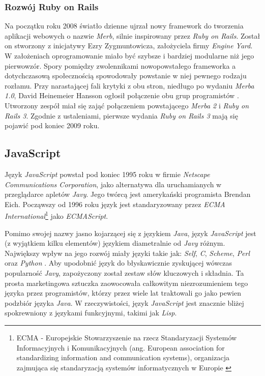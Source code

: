 \documentclass[a4paper,12pt]{article}
\begin{document}
\subsubsection{Rozwój Ruby on Rails}
Na początku roku 2008 światło dzienne ujrzał nowy framework do
tworzenia aplikacji webowych o nazwie \emph{Merb}, silnie inspirowany
przez \emph{Ruby on Rails}. Został on stworzony z inicjatywy Ezry
Zygmuntowicza, założyciela firmy \emph{Engine Yard}. W założeniach
oprogramowanie miało być szybsze i bardziej modularne niż jego
pierwowzór. Spory pomiędzy zwolennikami nowopowstałego frameworka a
dotychczasową społecznością spowodowały powstanie w niej pewnego
rodzaju rozłamu. Przy narastającej fali krytyki z obu stron, niedługo
po wydaniu \emph{Merba 1.0}, David Heinemeier Hansson ogłosił
połączenie obu grup programistów \cite{merge}. Utworzony zespół miał
się zająć połączeniem powstającego \emph{Merba 2} i \emph{Ruby on
  Rails 3}. Zgodnie z ustaleniami, pierwsze wydania \emph{Ruby on
  Rails 3} mają się pojawić pod koniec 2009 roku.

\subsection{JavaScript}
Język \emph{JavaScript} powstał pod koniec 1995 roku w firmie
\emph{Netscape Communications Corporation}, jako alternatywa dla
uruchamianych w przeglądarce apletów \emph{Javy}. Jego twórcą jest
amerykański programista Brendan Eich.  Począwszy od 1996 roku język
jest standaryzowany przez \emph{ECMA International}\footnote{ECMA -
  Europejskie Stowarzyszenie na rzecz Standaryzacji Systemów
  Informacyjnych i Komunikacyjnych (ang. European association for
  standardizing information and communication systems), organizacja
  zajmująca się standaryzacją systemów informatycznych w Europie
  \cite{ecma}} jako \emph{ECMAScript}.

Pomimo swojej nazwy jasno kojarzącej się z językiem \emph{Java}, język
\emph{JavaScript} jest (z wyjątkiem kilku elementów) językiem
diametralnie od \emph{Javy} różnym. Największy wpływ na jego rozwój
miały języki takie jak: \emph{Self}, \emph{C}, \emph{Scheme},
\emph{Perl} oraz \emph{Python} \cite{javascript}. Aby upodobnić język
do błyskawicznie zyskującej wówczas popularność \emph{Javy},
zapożyczony został zestaw słów kluczowych i składnia. Ta prosta
marketingowa sztuczka zaowocowała całkowitym niezrozumieniem tego
języka przez programistów, którzy przez wiele lat traktowali go jako
pewien podzbiór języka \emph{Java}. W rzeczywistości, język
\emph{JavaScript} jest znacznie bliżej spokrewniony z językami
funkcyjnymi, takimi jak \emph{Lisp}.
\end{document}
